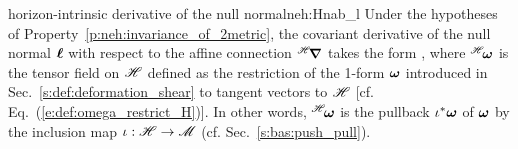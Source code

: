 \begin{tprop}{horizon-intrinsic derivative of the null normal}{neh:Hnab_l}
Under the hypotheses of Property~\ref{p:neh:invariance_of_2metric},
the covariant derivative of the null normal $\bm{\ell}$ with respect to the affine
connection ${}^{\mathscr{H}}\!\bm{\nabla}$ takes the form
\be \label{e:neh:nabH_ell}
   \encadre{ {}^\Hor\!\wnab \wl = \wl \otimes {}^\Hor\!\w{\omega} },
\ee
where ${}^{\mathscr{H}}\!\bm{\omega}$ is the tensor field on $\mathscr{H}$
defined as the restriction of the 1-form $\bm{\omega}$
introduced in Sec.~\ref{s:def:deformation_shear}
to tangent vectors to $\mathscr{H}$ [cf. Eq.~(\ref{e:def:omega_restrict_H})].
In other words, ${}^{\mathscr{H}}\!\bm{\omega}$ is the pullback $\iota^*\bm{\omega}$ of
$\bm{\omega}$ by the inclusion map $\iota: \mathscr{H} \to \mathscr{M}$ (cf. Sec.~\ref{s:bas:push_pull}).
\end{tprop}

